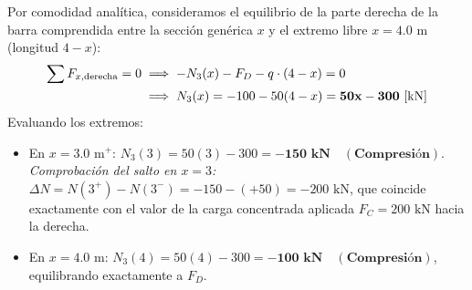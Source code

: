 Por comodidad analítica, consideramos el equilibrio de la parte derecha de la barra comprendida entre la sección genérica $x$ y el extremo libre $x = 4.0\text{ m}$ (longitud $4 - x$):
\begin{align}
    \sum F_{x,\text{derecha}} = 0 & \implies - N_3(x) - F_D - q \cdot (4 - x) = 0 \notag \\
                                  & \implies N_3(x) = - 100 - 50(4 - x) = \mathbf{50x - 300\text{ [kN]}}
\end{align}
Evaluando los extremos:
\begin{itemize}
    \item En $x = 3.0\text{ m}^+$: $N_3(3) = 50(3) - 300 = \mathbf{-150\text{ kN} \quad (\text{Compresión})}$.\\
    \textit{Comprobación del salto en $x=3$:} $\Delta N = N(3^+) - N(3^-) = -150 - (+50) = -200\text{ kN}$, que coincide exactamente con el valor de la carga concentrada aplicada $F_C = 200\text{ kN}$ hacia la derecha.
    \item En $x = 4.0\text{ m}$: $N_3(4) = 50(4) - 300 = \mathbf{-100\text{ kN} \quad (\text{Compresión})}$, equilibrando exactamente a $F_D$.
\end{itemize}
